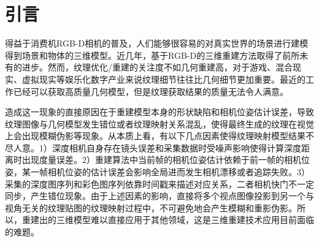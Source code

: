 


\section{引言}
得益于消费机RGB-D相机的普及，人们能够很容易的对真实世界的场景进行建模得到场景和物体的三维模型。近几年，基于RGB-D的三维重建方法取得了前所未有的进步。然而，纹理优化/重建的关注度不如几何重建高，对于游戏、混合现实、虚拟现实等娱乐化数字产业来说纹理细节往往比几何细节更加重要。最近的工作已经可以获取高质量几何模型，但是纹理获取结果的质量无法令人满意。\par

造成这一现象的直接原因在于重建模型本身的形状缺陷和相机位姿估计误差，导致纹理图像与几何模型发生错位或者纹理映射关系混乱，使得最终生成的纹理在视觉上会出现模糊伪影等现象。从本质上看，有以下几点因素使得纹理映射模型结果不尽人意。1）深度相机自身存在镜头误差和采集数据时受噪声影响使得计算深度距离时出现度量误差。2）重建算法中当前帧的相机位姿估计依赖于前一帧的相机位姿，某一帧相机位姿的估计误差会影响全局进而发生相机漂移或者追踪失败。3）采集的深度图序列和彩色图序列依靠时间戳来描述对应关系，二者相机快门不一定同步，产生错位现象。由于上述因素的影响，直接将多个视点图像投影到另一个与视角无关的纹理贴图的纹理映射过程中，不可避免地会产生模糊和重影伪影。所以，重建出的三维模型难以直接应用于其他领域，这是三维重建技术应用目前面临的难题。\par

